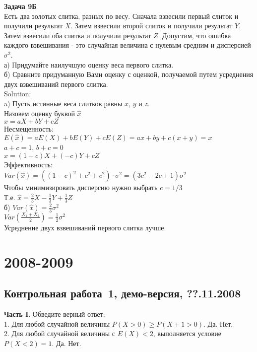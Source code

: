\documentclass[pdftex,12pt,a4paper]{article}
\begin{document}
\textbf{Задача 9Б} \\
Есть два золотых слитка, разных по весу. Сначала взвесили первый слиток и получили результат $X$. Затем взвесили второй слиток и получили результат $Y$. Затем взвесили оба слитка и получили результат $Z$. Допустим, что ошибка каждого взвешивания - это случайная величина с нулевым средним и дисперсией $\sigma^{2}$. \\
а) Придумайте наилучшую оценку веса первого слитка. \\
б) Сравните придуманную Вами оценку с оценкой, получаемой путем усреднения двух взвешиваний первого слитка. \\ 
Solution: \\
a) Пусть истинные веса слитков равны $x$, $y$ и $z$. \\
Назовем оценку буквой $\hat{x}$ \\
$\hat{x}=aX+bY+cZ$ \\
Несмещенность: $E(\hat{x})=aE(X)+bE(Y)+cE(Z)=ax+by+c(x+y)=x$ \\
$a+c=1$, $b+c=0$ \\
$\hat{x}=(1-c)X+(-c)Y+cZ$ \\
Эффективность: \\
$Var(\hat{x})=((1-c)^{2}+c^{2}+c^{2})\cdot \sigma^{2}=(3c^{2}-2c+1)\sigma^{2}$ \\
Чтобы минимизировать дисперсию нужно выбрать $c=1/3$ \\
Т.е. $\hat{x}=\frac{2}{3}X-\frac{1}{3}Y+\frac{1}{3}Z$ \\
б) $Var(\hat{x})=\frac{2}{3}\sigma^{2}$ \\
$Var\left(\frac{X_{1}+X_{2}}{2}\right)=\frac{1}{2}\sigma^{2}$ \\
Усреднение двух взвешиваний первого слитка лучше. \\

\section{2008-2009}
\subsection{Контрольная работа \No\,1, демо-версия, ??.11.2008}
\pagebreak 
\textbf{Часть I}. Обведите верный ответ: \\

1. Для любой случайной величины $P(X>0)\ge P(X+1>0)$. Да. Нет. \\

2. Для любой случайной величины с $E(X)<2$, выполняется условие $P(X<2)=1$. Да. Нет. \\
\end{document}

